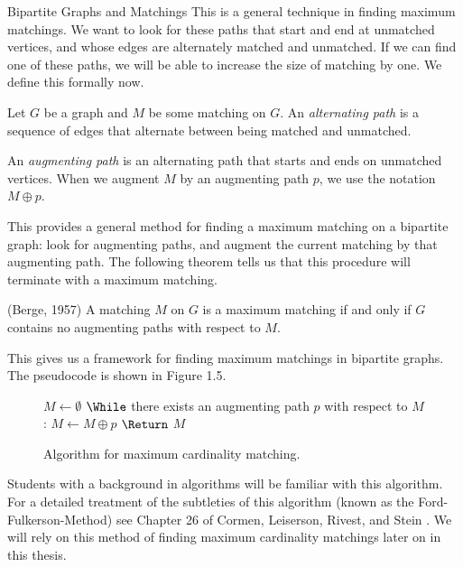\begin{section}{Bipartite Graphs and Matchings}
	This is a general technique in 
	finding maximum matchings. We want to look for these paths that start and end at unmatched 
	vertices, and whose edges are alternately matched and unmatched. If we can find one of these 
	paths, we will be able to increase the size of matching by one. We define this formally now.
	\begin{definition}
		Let $G$ be a graph and $M$ be some matching on $G$. An \emph{alternating path} is a 
		sequence of edges that alternate between being matched and unmatched.
	\end{definition}
	\begin{definition}
		An \emph{augmenting path} is an alternating path that starts and ends on unmatched 
		vertices. When we augment $M$ by an augmenting path $p$, we use the notation 
		$M\oplus p$.
	\end{definition}
	This provides a general method for finding a maximum matching on a bipartite graph: 
	look for augmenting paths, and augment the current matching by that augmenting 
	path. The following theorem tells us that this procedure will terminate with a maximum 
	matching.
	\begin{theorem}{(Berge, 1957)}
		A matching $M$ on $G$ is a maximum matching if and only if $G$ contains no augmenting 
		paths with respect to $M$.
	\end{theorem}
	This gives us a framework for finding maximum matchings in bipartite graphs. The pseudocode 
	is shown in Figure 1.5.
	\begin{figure}[h]
	\begin{center}
		\begin{minipage}{3in}
		\begin{codebox}
			\li $M \gets \emptyset $
			\li $\While$ there exists an augmenting path $p$ with respect to $M$:
				\Do
			\li		$M \gets M\oplus p$
				\End
			\li $\Return$ $M$
		\end{codebox}
		\end{minipage}
	\end{center}
		\caption{Algorithm for maximum cardinality matching.}
	\end{figure}
	Students with a background in algorithms will be familiar with this algorithm. For a detailed 
	treatment of the subtleties of this algorithm (known as the Ford-Fulkerson-Method) see Chapter 
	26 of Cormen, Leiserson, Rivest, and Stein \cite{cormen2009introduction}. We will rely on 
	this method of finding maximum cardinality matchings later on in this thesis.
\end{section}

